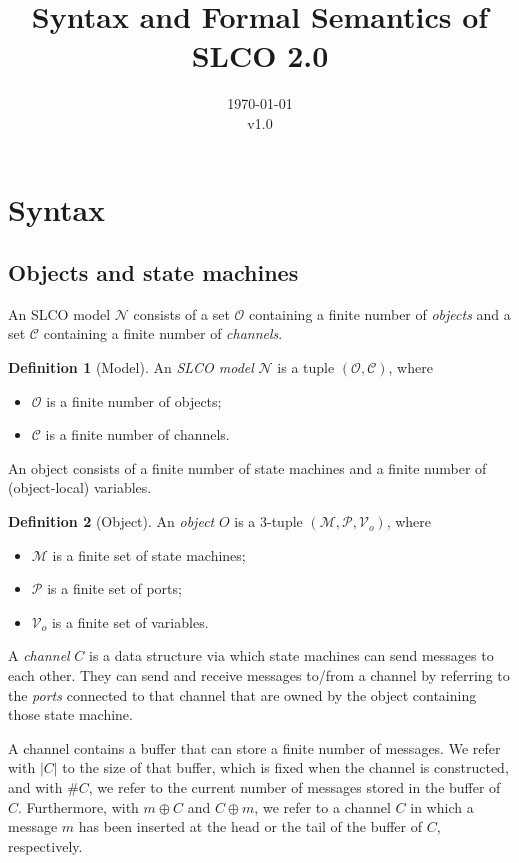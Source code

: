 \documentclass[parskip]{scrartcl}
\title{Syntax and Formal Semantics of\\ SLCO 2.0}
\author{}
\date{\today\\v1.0}
\newcommand{\smodel}{\mathcal{N}\xspace}
\newcommand{\Machines}{\mathcal{M}\xspace}
\newcommand{\Channels}{\mathcal{C}\xspace}
\newcommand{\Ports}{\mathcal{P}\xspace}
\newcommand{\Variables}{\mathcal{V}\xspace}
\newcommand{\Objects}{\mathcal{O}\xspace}
\theoremstyle{definition}
\newtheorem{definition}{Definition}
\begin{document}
\maketitle

\section{Syntax}

\subsection{Objects and state machines}

An SLCO model $\smodel$ consists of a set $\Objects$ containing a finite number of \emph{objects} and
a set $\Channels$ containing a finite number of \emph{channels}.

\begin{definition}[Model]
An \emph{SLCO model} $\smodel$ is a tuple $(\Objects, \Channels)$, where
\begin{itemize}
\item $\Objects$ is a finite number of objects;
\item $\Channels$ is a finite number of channels.
\end{itemize}
\end{definition}

An object consists of a finite number of state machines and a finite number of (object-local) variables.

\begin{definition}[Object]
An \emph{object} $O$ is a 3-tuple $(\Machines, \Ports, \Variables_o)$, where
\begin{itemize}
\item $\Machines$ is a finite set of state machines;
\item $\Ports$ is a finite set of ports;
\item $\Variables_o$ is a finite set of variables.
\end{itemize}
\end{definition}

A \emph{channel} $C$ is a data structure via which state machines can send messages to each other.
They can send and receive messages to/from a channel by referring to the \emph{ports} connected to that channel that are owned by the object containing those state machine.

A channel contains a buffer that can store a finite number of messages. We refer with $| C |$ to the size of that buffer, which is fixed when the channel is constructed, and with $\#C$, we refer to the current number of messages stored in the buffer of $C$. Furthermore, with $m \oplus C$ and $C \oplus m$, we refer to a channel $C$ in which a message $m$ has been inserted at the head or the tail of the buffer of $C$, respectively.
\end{document}
